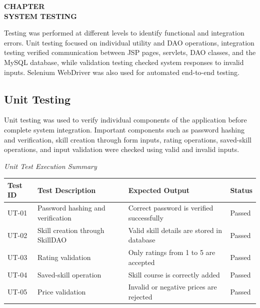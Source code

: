 \documentclass[12pt,a4paper]{report}
\newcommand{\chaptertitlepage}[1]{%
  \clearpage
  \thispagestyle{empty}
  \null
  \vfill
  \begin{center}
    {\fontsize{16pt}{18pt}\selectfont\bfseries CHAPTER \thechapter}\\[0.5cm]
    {\fontsize{16pt}{18pt}\selectfont\bfseries #1}
  \end{center}
  \vfill
  \null
  \clearpage
  \setcounter{section}{0}
}
\begin{document}
\chaptertitlepage{SYSTEM TESTING}


Testing was performed at different levels to identify functional and integration errors. Unit testing focused on individual utility and DAO operations, integration testing verified communication between JSP pages, servlets, DAO classes, and the MySQL database, while validation testing checked system responses to invalid inputs. Selenium WebDriver was also used for automated end-to-end testing.

\subsection{Unit Testing}
Unit testing was used to verify individual components of the application before complete system integration. Important components such as password hashing and verification, skill creation through form inputs, rating operations, saved-skill operations, and input validation were checked using valid and invalid inputs.

\vspace{0.3cm}
\noindent\textit{Unit Test Execution Summary}
\vspace{0.2cm}

\begin{table}[H]
\centering
\small
\begin{tabularx}{\textwidth}{|L{2.0cm}|L{4.0cm}|L{4.8cm}|L{2.0cm}|}
\hline
\textbf{Test ID} & \textbf{Test Description} & \textbf{Expected Output} & \textbf{Status} \\ \hline
UT-01 & Password hashing and verification & Correct password is verified successfully & Passed \\ \hline
UT-02 & Skill creation through SkillDAO & Valid skill details are stored in database & Passed \\ \hline
UT-03 & Rating validation & Only ratings from 1 to 5 are accepted & Passed \\ \hline
UT-04 & Saved-skill operation & Skill course is correctly added & Passed \\ \hline
UT-05 & Price validation & Invalid or negative prices are rejected & Passed \\ \hline
\end{tabularx}
\end{table}
\end{document}
